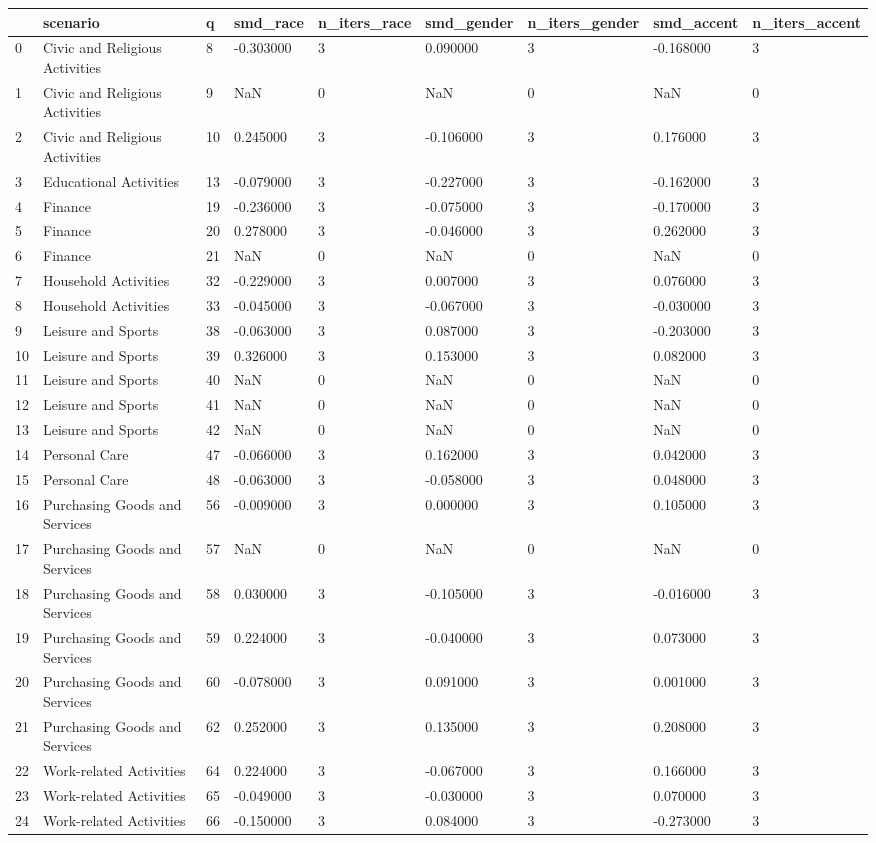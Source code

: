 \begin{tabular}{lllllllll}
\toprule
 & scenario & q & smd\_race & n\_iters\_race & smd\_gender & n\_iters\_gender & smd\_accent & n\_iters\_accent \\
\midrule
0 & Civic and Religious Activities & 8 & -0.303000 & 3 & 0.090000 & 3 & -0.168000 & 3 \\
1 & Civic and Religious Activities & 9 & NaN & 0 & NaN & 0 & NaN & 0 \\
2 & Civic and Religious Activities & 10 & 0.245000 & 3 & -0.106000 & 3 & 0.176000 & 3 \\
3 & Educational Activities & 13 & -0.079000 & 3 & -0.227000 & 3 & -0.162000 & 3 \\
4 & Finance & 19 & -0.236000 & 3 & -0.075000 & 3 & -0.170000 & 3 \\
5 & Finance & 20 & 0.278000 & 3 & -0.046000 & 3 & 0.262000 & 3 \\
6 & Finance & 21 & NaN & 0 & NaN & 0 & NaN & 0 \\
7 & Household Activities & 32 & -0.229000 & 3 & 0.007000 & 3 & 0.076000 & 3 \\
8 & Household Activities & 33 & -0.045000 & 3 & -0.067000 & 3 & -0.030000 & 3 \\
9 & Leisure and Sports & 38 & -0.063000 & 3 & 0.087000 & 3 & -0.203000 & 3 \\
10 & Leisure and Sports & 39 & 0.326000 & 3 & 0.153000 & 3 & 0.082000 & 3 \\
11 & Leisure and Sports & 40 & NaN & 0 & NaN & 0 & NaN & 0 \\
12 & Leisure and Sports & 41 & NaN & 0 & NaN & 0 & NaN & 0 \\
13 & Leisure and Sports & 42 & NaN & 0 & NaN & 0 & NaN & 0 \\
14 & Personal Care & 47 & -0.066000 & 3 & 0.162000 & 3 & 0.042000 & 3 \\
15 & Personal Care & 48 & -0.063000 & 3 & -0.058000 & 3 & 0.048000 & 3 \\
16 & Purchasing Goods and Services & 56 & -0.009000 & 3 & 0.000000 & 3 & 0.105000 & 3 \\
17 & Purchasing Goods and Services & 57 & NaN & 0 & NaN & 0 & NaN & 0 \\
18 & Purchasing Goods and Services & 58 & 0.030000 & 3 & -0.105000 & 3 & -0.016000 & 3 \\
19 & Purchasing Goods and Services & 59 & 0.224000 & 3 & -0.040000 & 3 & 0.073000 & 3 \\
20 & Purchasing Goods and Services & 60 & -0.078000 & 3 & 0.091000 & 3 & 0.001000 & 3 \\
21 & Purchasing Goods and Services & 62 & 0.252000 & 3 & 0.135000 & 3 & 0.208000 & 3 \\
22 & Work-related Activities & 64 & 0.224000 & 3 & -0.067000 & 3 & 0.166000 & 3 \\
23 & Work-related Activities & 65 & -0.049000 & 3 & -0.030000 & 3 & 0.070000 & 3 \\
24 & Work-related Activities & 66 & -0.150000 & 3 & 0.084000 & 3 & -0.273000 & 3 \\
\bottomrule
\end{tabular}
